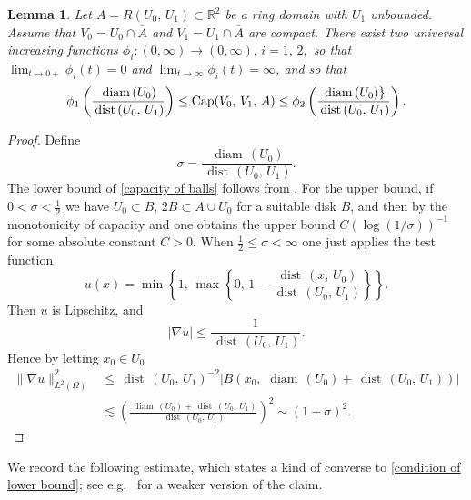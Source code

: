 \documentclass[reqno,11pt]{amsart}
\makeatletter
\def\dist{{\mathop\mathrm{\,dist\,}}}
\def\diam{{\mathop\mathrm{\,diam\,}}}
\newtheorem{lem}[thm]{Lemma}%
\numberwithin{equation}{section}
\theoremstyle{remark}
\makeatother
\begin{document}
\begin{lem}
Let $A=R(U_0,\,U_1)\subset\mathbb R^2$ be a ring domain with $U_1$ unbounded. Assume that $V_0=U_0\cap \overline{A}$ and $V_1=U_1\cap \overline{A}$ are compact.  There exist two universal increasing functions $\phi_i \colon (0,\infty) \to (0,\infty),\, i=1,\,2,$ so that $\lim_{t\to 0+} \phi_i(t) = 0$ and $\lim_{t\to \infty}\phi_i(t) = \infty$, and so that  
\begin{equation}\label{capacity of balls}
\phi_1\left(\frac{ \diam (U_0) }{\dist(U_0,\, U_1 )}\right) \le {\rm Cap}( V_0,\, V_1 ,\,A)\le \phi_2\left(\frac{ \diam (U_0) \}}{\dist(U_0,\, U_1)}\right). 
\end{equation}
\end{lem}

\begin{proof}
Define
$$\sigma=\frac{ \diam (U_0) }{\dist(U_0,\, U_1 )}.$$
The lower bound of \eqref{capacity of balls} follows from \cite[Theorem 11.7, Theorem 11.9]{V1971}. For the upper bound, if $0<\sigma<\frac 1 2$ we have $U_0 \subset B,\, 2B\subset A\cup U_0$ for a suitable disk $B$, and then by the monotonicity of capacity and \cite[Example 7.5]{V1971} one obtains the upper bound $C(\log (1/\sigma))^{-1}$ for some absolute constant $C>0$. When $\frac 1 2 \le \sigma<\infty$
 one just applies the test function
$$u(x)=\min\left\{1,\,\max\left\{0,\,1-\frac{\dist(x,\,U_0)}{\dist(U_0,\, U_1)}\right\}\right\}.$$
Then $u$ is Lipschitz,  and 
$$|\nabla u|\le \frac 1 {\dist(U_0,\, U_1)}. $$
Hence  by letting $x_0\in U_0$
\begin{align*}
\|\nabla u\|^2_{L^2(\Omega)}&\le {\dist(U_0,\, U_1)}^{-2} \left|B(x_0,\, \diam(U_0)+\dist(U_0,\,U_1))\right|\\ &\lesssim \left(\frac{\diam(U_0)+\dist(U_0,\,U_1)}{ \dist(U_0,\,  U_1)}\right)^2\sim(1+\sigma)^2.
\end{align*}
\end{proof}




We record the following estimate, which states a kind of converse to  \eqref{condition of lower bound}; see e.g.\ \cite[Lemma 2.2]{KZ2015} for a weaker version of the claim. 
\end{document}

